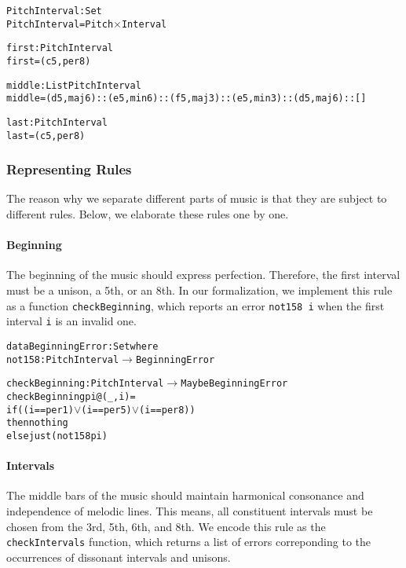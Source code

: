 \begin{alltt}
PitchInterval : Set
PitchInterval = Pitch \(\times\) Interval

first : PitchInterval
first = (c 5 , per8)

middle : List PitchInterval
middle = (d 5 , maj6) :: (e 5 , min6) :: (f 5 , maj3) :: (e 5 , min3) :: (d 5 , maj6) :: []

last : PitchInterval
last = (c 5 , per8)
\end{alltt}

\subsubsection{Representing Rules}

The reason why we separate different parts of music is that
they are subject to different rules.
Below, we elaborate these rules one by one.

\paragraph{Beginning}

The beginning of the music should express perfection.
Therefore, the first interval must be a unison, a 5th, or an 8th.
In our formalization, we implement this rule as a function
\texttt{checkBeginning}, which reports an error \texttt{not158 i}
when the first interval \texttt{i} is an invalid one.

\begin{alltt}
data BeginningError : Set where
  not158   : PitchInterval \(\rightarrow\) BeginningError
  
checkBeginning : PitchInterval \(\rightarrow\) Maybe BeginningError
checkBeginning pi@(_ , i) =
  if ((i == per1) \(\vee\) (i == per5) \(\vee\) (i == per8))
  then nothing
  else just (not158 pi)
\end{alltt}

\paragraph{Intervals}

The middle bars of the music should maintain harmonical
consonance and independence of melodic lines.
This means, all constituent intervals must be chosen from the 3rd,
5th, 6th, and 8th.
We encode this rule as the \texttt{checkIntervals} function,
which returns a list of errors correponding to the occurrences of
dissonant intervals and unisons.

